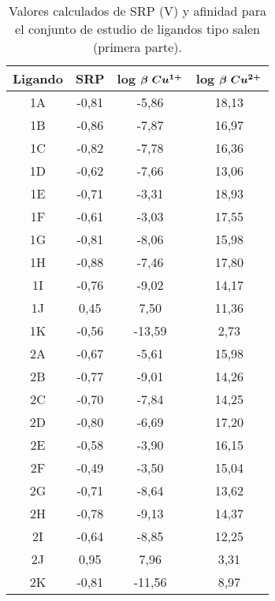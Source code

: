 \begin{table}[h]
\centering
\caption{Valores calculados de SRP (V) y afinidad para el conjunto de estudio de ligandos tipo salen (primera parte).}
\begin{tabular}{c|ccc}
\hline
\textbf{Ligando} & \textbf{SRP} & \textbf{log $\boldsymbol{\beta$ $Cu^{1+}}$} & \textbf{log $\boldsymbol{\beta$ $Cu^{2+}}$} \\ \hline
1A               & -0,81        & -5,86                & 18,13                 \\
1B               & -0,86        & -7,87                & 16,97                 \\
1C               & -0,82        & -7,78                & 16,36                 \\
1D               & -0,62        & -7,66                & 13,06                 \\
1E               & -0,71        & -3,31                & 18,93                 \\
1F               & -0,61        & -3,03                & 17,55                 \\
1G               & -0,81        & -8,06                & 15,98                 \\
1H               & -0,88        & -7,46                & 17,80                 \\
1I               & -0,76        & -9,02                & 14,17                 \\
1J               & 0,45         & 7,50                 & 11,36                 \\
1K               & -0,56        & -13,59               & 2,73                  \\
2A               & -0,67        & -5,61                & 15,98                 \\
2B               & -0,77        & -9,01                & 14,26                 \\
2C               & -0,70        & -7,84                & 14,25                 \\
2D               & -0,80        & -6,69                & 17,20                 \\
2E               & -0,58        & -3,90                & 16,15                 \\
2F               & -0,49        & -3,50                & 15,04                 \\
2G               & -0,71        & -8,64                & 13,62                 \\
2H               & -0,78        & -9,13                & 14,37                 \\
2I               & -0,64        & -8,85                & 12,25                 \\
2J               & 0,95         & 7,96                 & 3,31                  \\
2K               & -0,81        & -11,56               & 8,97                  \\ \hline
\end{tabular}
\end{table}

